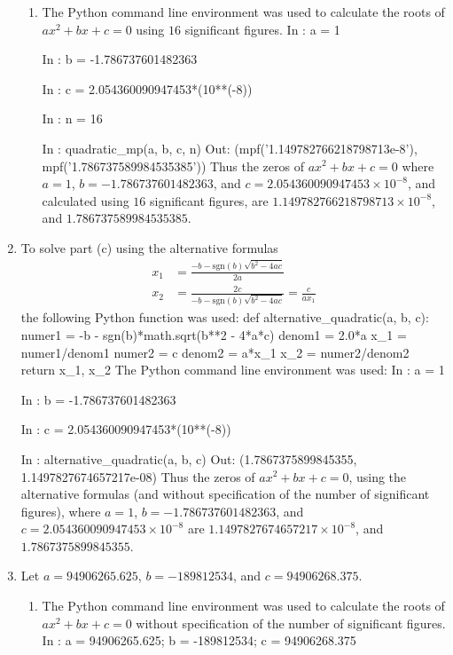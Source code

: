 \documentclass[12pt]{article}
\newenvironment{qv}
{\quote\Verbatim}
{\endVerbatim\endquote}
\begin{document}
\begin{enumerate}[\ (a)\ ]
\begin{enumerate}[\ (i) \ ]
\item The Python command line environment was used to calculate the roots of $ax^2 + bx + c = 0$ using $16$ significant figures.
\begin{qv}
In : a = 1

In : b = -1.786737601482363

In : c = 2.054360090947453*(10**(-8))

In : n = 16

In : quadratic_mp(a, b, c, n)
Out: (mpf('1.149782766218798713e-8'), mpf('1.786737589984535385'))
\end{qv}
Thus the zeros of $ax^2 + bx + c = 0$ where $a = 1$, $b = -1.786737601482363$, and $c = 2.054360090947453\times 10^{-8}$, and calculated using $16$ significant figures, are $\boxed{1.149782766218798713\times 10^{-8}}$, and $\boxed{1.786737589984535385}$.
\end{enumerate}

\item {}
To solve part (c) using the alternative formulas
\begin{align*}
x_1 &= \frac{-b - \text{sgn}(b)\sqrt{b^2 - 4ac}}{2a} \\[.4cm]
x_2 &= \frac{2c}{-b - \text{sgn}(b)\sqrt{b^2 - 4ac}} = \frac{c}{ax_1}
\end{align*}
the following Python function was used:
\begin{qv}
def alternative_quadratic(a, b, c):
    numer1 = -b - sgn(b)*math.sqrt(b**2 - 4*a*c)
    denom1 = 2.0*a
    x_1 = numer1/denom1
    numer2 = c
    denom2 = a*x_1
    x_2 = numer2/denom2
    return x_1, x_2
\end{qv}
The Python command line environment was used:
\begin{qv}
In : a = 1

In : b = -1.786737601482363

In : c = 2.054360090947453*(10**(-8))

In : alternative_quadratic(a, b, c)
Out: (1.7867375899845355, 1.1497827674657217e-08)
\end{qv}
Thus the zeros of $ax^2 + bx + c = 0$, using the alternative formulas (and without specification of the number of significant figures), where $a = 1$, $b = -1.786737601482363$, and $c = 2.054360090947453\times 10^{-8}$ are $\boxed{1.1497827674657217\times 10^{-8}}$, and $\boxed{1.7867375899845355}$.

\item {}
Let $a = 94906265.625$, $b = -189812534$, and $c = 94906268.375$.
\begin{enumerate}[\ (i) \ ]
\item The Python command line environment was used to calculate the roots of $ax^2 + bx + c = 0$ without specification of the number of significant figures.
\begin{qv}
In : a = 94906265.625; b = -189812534; c = 94906268.375


\end{qv}
\end{enumerate}
\end{enumerate}
\end{document}
